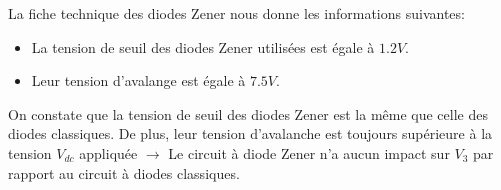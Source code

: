 \documentclass{../../template/tp}
\begin{document}
{
    La fiche technique des diodes Zener nous donne les informations suivantes:
\begin{itemize}
\item La tension de seuil des diodes Zener utilisées est égale à  $1.2 V$.
\item Leur tension d'avalange est égale à $7.5 V$.
\end{itemize}
On constate que la tension de seuil des diodes Zener est la même que celle des diodes classiques. De plus, leur tension d'avalanche est toujours supérieure à la tension $V_{dc}$ appliquée $\longrightarrow$ Le circuit à diode Zener n'a aucun impact sur $V_3$ par rapport au circuit à diodes classiques.
}






\end{document}
